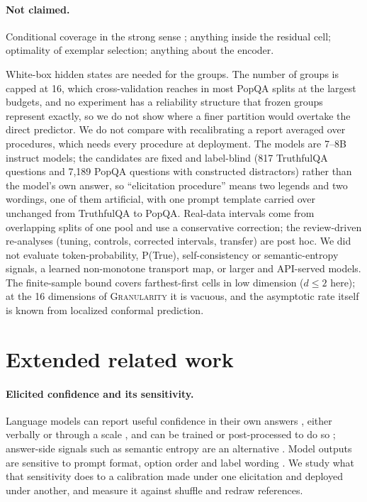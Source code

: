\documentclass[11pt]{article}
\theoremstyle{definition}
\theoremstyle{remark}
\newcommand{\1}{\mathbf{1}}
\newcommand{\expname}[1]{\textsc{#1}}
\begin{document}
\paragraph{Not claimed.}
Conditional coverage in the strong sense \citep{barber2021limits}; anything
inside the residual cell; optimality of exemplar selection; anything about the
encoder.

White-box hidden states are needed for the groups. The number of groups is
capped at 16, which cross-validation reaches in most PopQA splits at the largest budgets, and no
experiment has a reliability structure that frozen groups represent exactly, so we do not show where a
finer partition would overtake the direct predictor. We do not compare with recalibrating a report
averaged over procedures, which needs every procedure at deployment. The models are 7--8B
instruct models; the candidates are fixed and label-blind (817 TruthfulQA questions and 7{,}189 PopQA
questions with constructed distractors) rather than the model's own answer, so ``elicitation
procedure'' means two legends and two wordings, one of them artificial, with one prompt template
carried over unchanged from TruthfulQA to PopQA. Real-data intervals
come from overlapping splits of one pool and use a conservative correction; the review-driven
re-analyses (tuning, controls, corrected intervals, transfer) are post hoc. We did not evaluate
token-probability, P(True), self-consistency or semantic-entropy signals, a learned non-monotone transport
map, or larger and API-served models. The finite-sample bound covers farthest-first cells in low
dimension ($d\le2$ here); at the 16 dimensions of \expname{Granularity} it is vacuous, and the asymptotic rate itself is
known from localized conformal prediction.

\section{Extended related work}
\label{app:related}
\paragraph{Elicited confidence and its sensitivity.} Language models can report useful confidence
in their own answers \citep{kadavath2022language,jiang2021how}, either verbally or through a scale
\citep{lin2022teaching,tian2023just,xiong2024can}, and can be trained or post-processed to do so
\citep{kapoor2024large,ulmer2024calibrating}; answer-side signals such as semantic entropy are an
alternative \citep{kuhn2023semantic}. Model outputs are sensitive to prompt format, option order and
label wording \citep{zhao2021calibrate,sclar2024quantifying,zheng2024large,pezeshkpour2024large}. We
study what that sensitivity does to a calibration made under one elicitation and deployed under
another, and measure it against shuffle and redraw references.
\end{document}
